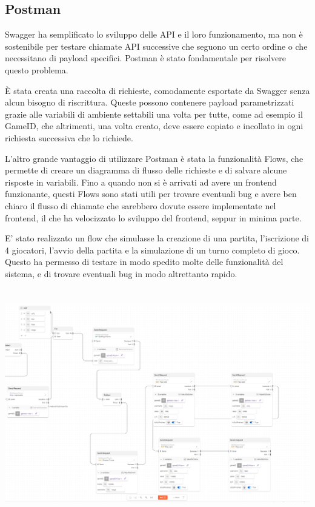 \subsection{Postman}

Swagger ha semplificato lo sviluppo delle API e il loro funzionamento, ma non è sostenibile per testare chiamate API successive che seguono un certo ordine o che necessitano di payload specifici. Postman è stato fondamentale per risolvere questo problema.

È stata creata una raccolta di richieste, comodamente esportate da Swagger senza alcun bisogno di riscrittura. Queste possono contenere payload parametrizzati grazie alle variabili di ambiente settabili una volta per tutte, come ad esempio il GameID, che altrimenti, una volta creato, deve essere copiato e incollato in ogni richiesta successiva che lo richiede.

L'altro grande vantaggio di utilizzare Postman è stata la funzionalità Flows, che permette di creare un diagramma di flusso delle richieste e di salvare alcune risposte in variabili. Fino a quando non si è arrivati ad avere un frontend funzionante, questi Flows sono stati utili per trovare eventuali bug e avere ben chiaro il flusso di chiamate che sarebbero dovute essere implementate nel frontend, il che ha velocizzato lo sviluppo del frontend, seppur in minima parte.

E' stato realizzato un flow che simulasse la creazione di una partita, l'iscrizione di 4 giocatori, l'avvio della partita e la simulazione di un turno completo di gioco. Questo ha permesso di testare in modo spedito molte delle funzionalità del sistema, e di trovare eventuali bug in modo altrettanto rapido.

\includegraphics[width=18cm, height=10cm]{report/img/postManFlow.png}\\[7.5cm]


